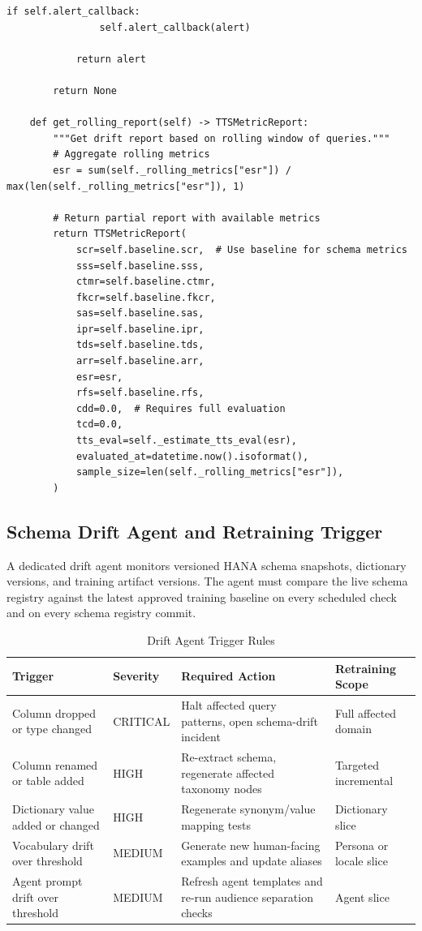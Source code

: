 \begin{lstlisting}[language=jsonx,caption={Production drift monitor (simula\_tts\_drift\_monitor.py)}]
            if self.alert_callback:
                self.alert_callback(alert)
            
            return alert
        
        return None
    
    def get_rolling_report(self) -> TTSMetricReport:
        """Get drift report based on rolling window of queries."""
        # Aggregate rolling metrics
        esr = sum(self._rolling_metrics["esr"]) / max(len(self._rolling_metrics["esr"]), 1)
        
        # Return partial report with available metrics
        return TTSMetricReport(
            scr=self.baseline.scr,  # Use baseline for schema metrics
            sss=self.baseline.sss,
            ctmr=self.baseline.ctmr,
            fkcr=self.baseline.fkcr,
            sas=self.baseline.sas,
            ipr=self.baseline.ipr,
            tds=self.baseline.tds,
            arr=self.baseline.arr,
            esr=esr,
            rfs=self.baseline.rfs,
            cdd=0.0,  # Requires full evaluation
            tcd=0.0,
            tts_eval=self._estimate_tts_eval(esr),
            evaluated_at=datetime.now().isoformat(),
            sample_size=len(self._rolling_metrics["esr"]),
        )
\end{lstlisting}

\subsection{Schema Drift Agent and Retraining Trigger}

A dedicated drift agent monitors versioned HANA schema snapshots, dictionary
versions, and training artifact versions. The agent must compare the live schema
registry against the latest approved training baseline on every scheduled check
and on every schema registry commit.

\begin{table}[htbp]
\centering
\caption{Drift Agent Trigger Rules}
\label{tab:drift-agent-triggers}
\begin{tabularx}{\textwidth}{@{}l l X l@{}}
\toprule
\textbf{Trigger} & \textbf{Severity} & \textbf{Required Action} & \textbf{Retraining Scope} \\
\midrule
Column dropped or type changed & CRITICAL & Halt affected query patterns, open schema-drift incident & Full affected domain \\
Column renamed or table added & HIGH & Re-extract schema, regenerate affected taxonomy nodes & Targeted incremental \\
Dictionary value added or changed & HIGH & Regenerate synonym/value mapping tests & Dictionary slice \\
Vocabulary drift over threshold & MEDIUM & Generate new human-facing examples and update aliases & Persona or locale slice \\
Agent prompt drift over threshold & MEDIUM & Refresh agent templates and re-run audience separation checks & Agent slice \\
\bottomrule
\end{tabularx}
\end{table}


